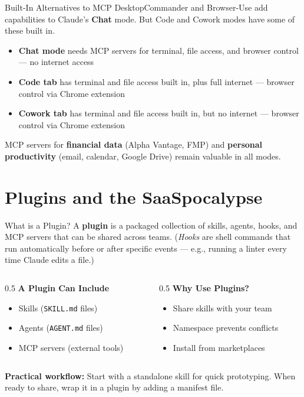 \documentclass[aspectratio=169]{beamer}
\begin{document}
\begin{frame}{Built-In Alternatives to MCP}
DesktopCommander and Browser-Use add capabilities to Claude's \textbf{Chat} mode. But Code and Cowork modes have some of these built in.
\vspace{0.3cm}
\begin{itemize}
  \item \textbf{Chat mode} needs MCP servers for terminal, file access, and browser control --- no internet access
  \item \textbf{Code tab} has terminal and file access built in, plus full internet --- browser control via Chrome extension
  \item \textbf{Cowork tab} has terminal and file access built in, but no internet --- browser control via Chrome extension
\end{itemize}
\vspace{0.3cm}
MCP servers for \textbf{financial data} (Alpha Vantage, FMP) and \textbf{personal productivity} (email, calendar, Google Drive) remain valuable in all modes.
\end{frame}

\section{Plugins and the SaaSpocalypse}

\begin{frame}{What is a Plugin?}
A \textbf{plugin} is a packaged collection of skills, agents, hooks, and MCP servers that can be shared across teams.  (\textit{Hooks} are shell commands that run automatically before or after specific events --- e.g., running a linter every time Claude edits a file.)
\vspace{0.3cm}
\begin{columns}[T]
\begin{column}{0.5\textwidth}
\textbf{A Plugin Can Include}
\begin{itemize}\small
  \item Skills (\texttt{SKILL.md} files)
  \item Agents (\texttt{AGENT.md} files)
  \item MCP servers (external tools)
\end{itemize}
\end{column}
\begin{column}{0.5\textwidth}
\textbf{Why Use Plugins?}
\begin{itemize}\small
  \item Share skills with your team
  \item Namespace prevents conflicts
  \item Install from marketplaces
\end{itemize}
\end{column}
\end{columns}
\vspace{0.3cm}
\textbf{Practical workflow:} Start with a standalone skill for quick prototyping. When ready to share, wrap it in a plugin by adding a manifest file.
\end{frame}
\end{document}
